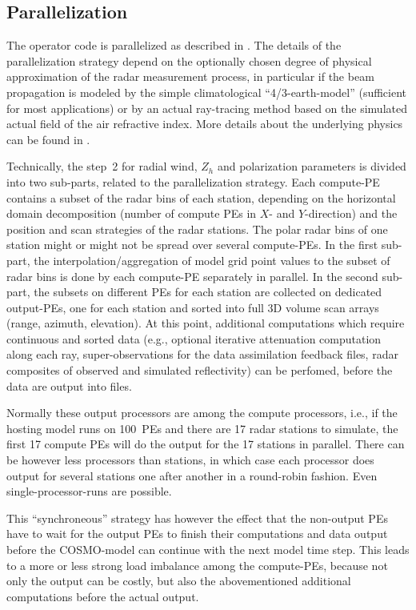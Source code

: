 \documentclass[10pt,a4paper,twoside,headinclude,footinclude,parskip=half]{scrartcl}
\newcommand{\myaktuellesection}{sec:intro}%
\newcommand{\labelsec}[1]{\label{#1}\renewcommand{\myaktuellesection}{#1}}%
\newcommand{\labelsec}[1]{\label{#1}}%
\newcommand{\citeP}[1]{\citet{#1}}
\begin{document}
\subsection{Parallelization}

\labelsec{sec:intro:parallel}

The operator code is parallelized as described in \citeP{zeng2016a}. The details of the
parallelization strategy depend on the optionally chosen degree of physical approximation of the radar
measurement process, in particular if the beam propagation is modeled by the simple
climatological ``4/3-earth-model'' (sufficient for most applications) or by an actual
ray-tracing method based on the simulated actual field of the air refractive index.
More details about the underlying physics can be found in \citeP{zeng2014}. 


Technically, the step~2 for radial wind, $Z_h$ and polarization parameters is divided into two sub-parts,
related to the parallelization strategy. Each compute-PE contains a subset of the radar bins
of each station, depending on the horizontal domain decomposition (number of compute PEs in $X$- and $Y$-direction)
and the position and scan strategies of the radar stations. The polar radar bins of
one station might or might not be spread over several compute-PEs. In the first sub-part, 
the interpolation/aggregation of model grid point values to the subset of radar bins is done by
each compute-PE separately in parallel. In the second sub-part, the subsets on different PEs for
each station are collected on dedicated output-PEs, one for each station and sorted into full
3D volume scan arrays (range, azimuth, elevation). At this point, additional computations
which require continuous and sorted data (e.g., optional iterative attenuation computation along each ray,
super-observations for the data assimilation feedback files, radar composites of observed and simulated reflectivity) can
be perfomed, before the data are output into files.

Normally these output processors are among the compute processors, i.e., if the hosting model runs on 100~PEs and there are 17 radar stations to simulate,
the first 17 compute PEs will do the output for the 17 stations in parallel. There can be
however less processors than stations, in which case each processor does output for several stations one after another
in a round-robin fashion. Even single-processor-runs are possible.

This ``synchroneous'' strategy has however the effect that the non-output PEs have to
wait for the output PEs to finish their computations and data output before the COSMO-model
can continue with the next model time step. This leads to a more or less strong
load imbalance among the compute-PEs, because not only the output can be costly, but also the
abovementioned additional computations before the actual output.
\end{document}
